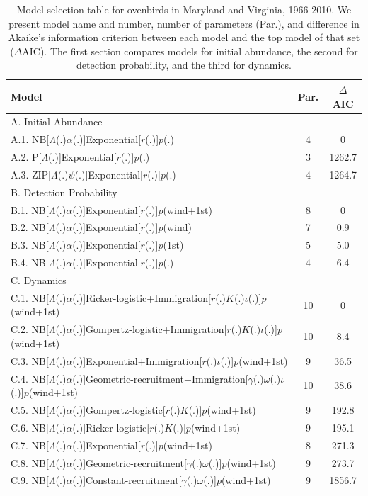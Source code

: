 \documentclass[12pt]{article}
\begin{document}
\begin{table}
  \centering
  \small
\caption{Model selection table for ovenbirds in Maryland and Virginia,
    1966-2010.  We present model name and number, number of 
parameters (Par.), and difference in Akaike's
information criterion between each model and the top model of
that set ($\Delta$AIC).  The first section compares
models for initial abundance, the second for detection
probability, and the third for dynamics.}
  \begin{tabular}[h]{lcc}
\hline
Model	&Par.	&$\Delta$AIC	\\
\hline
A. Initial Abundance && \\
A.1. NB[$\Lambda$(.)$\alpha$(.)]Exponential[$r$(.)]$p$(.)	&4	&0\\
A.2. P[$\Lambda$(.)]Exponential[$r$(.)]$p$(.)	&3	&1262.7\\
A.3. ZIP[$\Lambda$(.)$\psi$(.)]Exponential[$r$(.)]$p$(.)	&4 &1264.7\\
\hline
B. Detection Probability && \\
B.1. NB[$\Lambda$(.)$\alpha$(.)]Exponential[$r$(.)]$p$(wind+1st)	&8 &0	\\
B.2. NB[$\Lambda$(.)$\alpha$(.)]Exponential[$r$(.)]$p$(wind) &7 &0.9\\
B.3. NB[$\Lambda$(.)$\alpha$(.)]Exponential[$r$(.)]$p$(1st)	&5	&5.0
\\B.4. NB[$\Lambda$(.)$\alpha$(.)]Exponential[$r$(.)]$p$(.)	&4	&6.4\\
\hline
C. Dynamics && \\
C.1. NB[$\Lambda$(.)$\alpha$(.)]Ricker-logistic+Immigration[$r$(.)$K$(.)$\iota$(.)]$p$(wind+1st) &10	&0	\\
C.2. NB[$\Lambda$(.)$\alpha$(.)]Gompertz-logistic+Immigration[$r$(.)$K$(.)$\iota$(.)]$p$(wind+1st) &10	&8.4 \\
C.3. NB[$\Lambda$(.)$\alpha$(.)]Exponential+Immigration[$r$(.)$\iota$(.)]$p$(wind+1st) &9	&36.5\\
C.4. NB[$\Lambda$(.)$\alpha$(.)]Geometric-recruitment+Immigration[$\gamma$(.)$\omega$(.)$\iota$(.)]$p$(wind+1st) &10	&38.6\\
C.5. NB[$\Lambda$(.)$\alpha$(.)]Gompertz-logistic[$r$(.)$K$(.)]$p$(wind+1st) &9	&192.8\\
C.6. NB[$\Lambda$(.)$\alpha$(.)]Ricker-logistic[$r$(.)$K$(.)]$p$(wind+1st) &9	&195.1\\
C.7. NB[$\Lambda$(.)$\alpha$(.)]Exponential[$r$(.)]$p$(wind+1st)	&8 &271.3\\
C.8. NB[$\Lambda$(.)$\alpha$(.)]Geometric-recruitment[$\gamma$(.)$\omega$(.)]$p$(wind+1st) &9	&273.7\\
C.9. NB[$\Lambda$(.)$\alpha$(.)]Constant-recruitment[$\gamma$(.)$\omega$(.)]$p$(wind+1st) &9	&1856.7\\
\hline
\end{tabular}
\end{table}
\end{document}
